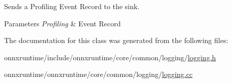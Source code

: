 Sends a Profiling Event Record to the sink. 
\begin{DoxyParams}{Parameters}
{\em Profiling} & Event Record \\
\hline
\end{DoxyParams}


The documentation for this class was generated from the following files\+:\begin{DoxyCompactItemize}
\item 
onnxruntime/include/onnxruntime/core/common/logging/\mbox{\hyperlink{logging_8h}{logging.\+h}}\item 
onnxruntime/onnxruntime/core/common/logging/\mbox{\hyperlink{logging_8cc}{logging.\+cc}}\end{DoxyCompactItemize}
